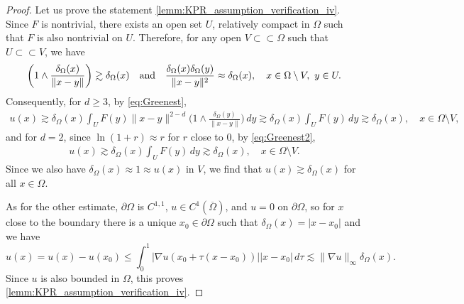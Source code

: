 \documentclass[12pt,a4paper]{amsart}
\theoremstyle{definition}
\begin{document}
\begin{proof}
Let us prove the statement \ref{lemm:KPR_assumption_verification_iv}.
Since $F$ is nontrivial, there exists an open set $U$, relatively compact in $\Omega$ such that $F$ is also nontrivial on $U$. Therefore, for any open $V\subset\subset \Omega$ such that $U\subset \subset V$,
we have
\begin{align*}
    \bigg(1\wedge \frac{\delta_\Omega(x)}{\lVert x-y \rVert}\bigg)\gtrsim\delta_\Omega(x)\quad \textnormal{and}\quad \frac{\delta_\Omega(x)\delta_\Omega(y)}{\lVert x-y \rVert^2}\approx \delta_\Omega(x),\quad x\in \Omega\setminus V,\ y\in U.
\end{align*} 
Consequently, for $d\geq 3$, by \eqref{eq:Greenest},
\begin{align*}
    u(x) \gtrsim \delta_\Omega(x) \int_U F(y) \lVert x-y \rVert^{2-d}\bigg(1\wedge \frac{\delta_\Omega(y)}{\lVert x-y \rVert}\bigg)\, dy \gtrsim \delta_\Omega(x)\int_U F(y)\, dy \gtrsim \delta_\Omega(x),\quad   x\in \Omega\setminus V, 
\end{align*}
and for $d=2$, since $\ln(1+r) \approx r$ for $r$ close to $0$, by \eqref{eq:Greenest2},
\begin{align*}
    u(x) \gtrsim \delta_\Omega(x)\int_U F(y)\, dy \gtrsim \delta_\Omega(x),\quad x\in \Omega\setminus V.
\end{align*}
Since we also have $\delta_\Omega(x) \approx 1 \approx u (x)$ in $V$, we find that $u(x)\gtrsim \delta_\Omega(x)$ for all $x\in \Omega$. 

 As for the other estimate, $\partial \Omega$  is $C^{1,1}$, $u\in C^1(\overline{\Omega})$, and $u=0$ on $\partial \Omega$, so for $x$ close to the boundary there is a unique $x_0\in \partial \Omega$ such that $\delta_\Omega(x) = |x-x_0|$ and we have $$u(x) = u(x) - u(x_0) \leq \int_0^1 |\nabla u(x_0 + \tau(x-x_0))||x-x_0|\, d\tau  \lesssim \|\nabla u\|_\infty\delta_\Omega(x).$$ Since $u$ is also bounded in  $\Omega$, this proves \ref{lemm:KPR_assumption_verification_iv}. 



\end{proof}
\end{document}
